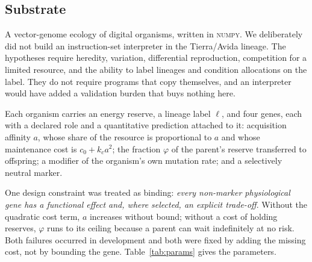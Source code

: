 \documentclass[review,3p,times]{elsarticle}
\begin{document}
\subsection{Substrate}

A vector-genome ecology of digital organisms, written in \textsc{numpy}. We
deliberately did not build an instruction-set interpreter in the Tierra/Avida
lineage. The hypotheses require heredity, variation, differential reproduction,
competition for a limited resource, and the ability to label lineages and
condition allocations on the label. They do not require programs that copy
themselves, and an interpreter would have added a validation burden that buys
nothing here.

Each organism carries an energy reserve, a lineage label $\ell$, and four
genes, each with a declared role and a quantitative prediction attached to it:
acquisition affinity $a$, whose share of the resource is proportional to $a$
and whose maintenance cost is $c_0 + k_c a^2$; the fraction $\varphi$ of the
parent's reserve transferred to offspring; a modifier of the organism's own
mutation rate; and a selectively neutral marker.

One design constraint was treated as binding: \emph{every non-marker
physiological gene has a functional effect and, where selected, an explicit
trade-off}. Without the quadratic cost term, $a$ increases without bound;
without a cost of holding reserves, $\varphi$ runs to its ceiling because a
parent can wait indefinitely at no risk. Both failures occurred in development
and both were fixed by adding the missing cost, not by bounding the gene.
Table~\ref{tab:params} gives the parameters.
\end{document}

